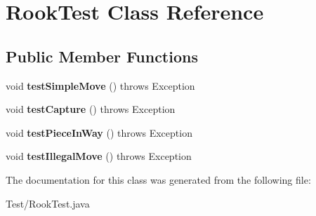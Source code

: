 \hypertarget{class_rook_test}{}\section{Rook\+Test Class Reference}
\label{class_rook_test}
\subsection*{Public Member Functions}
\begin{DoxyCompactItemize}
\item 
\hypertarget{class_rook_test_a2d1311a187a6d0afdd96e4225f9342c2}{}void {\bfseries test\+Simple\+Move} ()  throws Exception \label{class_rook_test_a2d1311a187a6d0afdd96e4225f9342c2}

\item 
\hypertarget{class_rook_test_a6bbef09ae19196d68873ddb1a72c1d8b}{}void {\bfseries test\+Capture} ()  throws Exception \label{class_rook_test_a6bbef09ae19196d68873ddb1a72c1d8b}

\item 
\hypertarget{class_rook_test_a394de28faebf871ee55a14c2145071f3}{}void {\bfseries test\+Piece\+In\+Way} ()  throws Exception \label{class_rook_test_a394de28faebf871ee55a14c2145071f3}

\item 
\hypertarget{class_rook_test_a6bad72f1735a97416a70f63fa308a481}{}void {\bfseries test\+Illegal\+Move} ()  throws Exception \label{class_rook_test_a6bad72f1735a97416a70f63fa308a481}

\end{DoxyCompactItemize}


The documentation for this class was generated from the following file\+:\begin{DoxyCompactItemize}
\item 
Test/Rook\+Test.\+java\end{DoxyCompactItemize}

